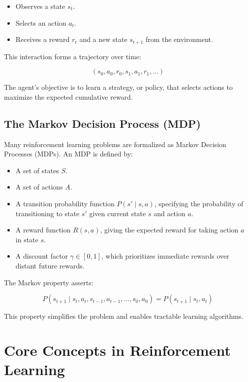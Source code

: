 \documentclass[openany]{book}
\begin{document}
\begin{itemize}
    \item Observes a state \( s_t \).
    \item Selects an action \( a_t \).
    \item Receives a reward \( r_t \) and a new state \( s_{t+1} \) from the
     environment.
\end{itemize}

This interaction forms a trajectory over time:

\[
(s_0, a_0, r_0, s_1, a_1, r_1, \dots)
\]

The agent's objective is to learn a strategy, or policy, that selects actions 
to maximize the expected cumulative reward.

\subsection{The Markov Decision Process (MDP)}

Many reinforcement learning problems are formalized as Markov Decision Processes
(MDPs). An MDP is defined by:

\begin{itemize}
    \item A set of states \( S \).
    \item A set of actions \( A \).
    \item A transition probability function \( P(s' \mid s, a) \), specifying 
    the probability of transitioning to state \( s' \) given current state 
    \( s \) and action \( a \).
    \item A reward function \( R(s,a) \), giving the expected reward for taking 
    action \( a \) in state \( s \).
    \item A discount factor \( \gamma \in [0,1] \), which prioritizes immediate 
    rewards over distant future rewards.
\end{itemize}

The Markov property asserts:

\[
P(s_{t+1} \mid s_t, a_t, s_{t-1}, a_{t-1}, \dots, s_0, a_0) = P(s_{t+1} 
\mid s_t, a_t)
\]

This property simplifies the problem and enables tractable learning algorithms.

\section{Core Concepts in Reinforcement Learning}
\end{document}

